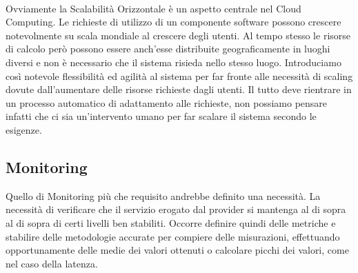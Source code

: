 \paragraph{}
Ovviamente la Scalabilità Orizzontale è un aspetto centrale nel Cloud Computing. Le richieste di utilizzo di un componente software possono crescere notevolmente su scala mondiale al crescere degli utenti. Al tempo stesso le risorse di calcolo però possono essere anch'esse distribuite geograficamente in luoghi diversi e non è necessario che il sistema risieda nello stesso luogo. Introduciamo così notevole flessibilità ed agilità al sistema per far fronte alle necessità di scaling dovute dall'aumentare delle risorse richieste dagli utenti. Il tutto deve rientrare in un processo automatico di adattamento alle richieste, non possiamo pensare infatti che ci sia un'intervento umano per far scalare il sistema secondo le esigenze.

\subsection{Monitoring}
Quello di Monitoring più che requisito andrebbe definito una necessità. La necessità di verificare che il servizio erogato dal provider si mantenga al di sopra al di sopra di certi livelli ben stabiliti. Occorre definire quindi delle metriche e stabilire delle metodologie accurate per compiere delle misurazioni, effettuando opportunamente delle medie dei valori ottenuti o calcolare picchi dei valori, come nel caso della latenza.

